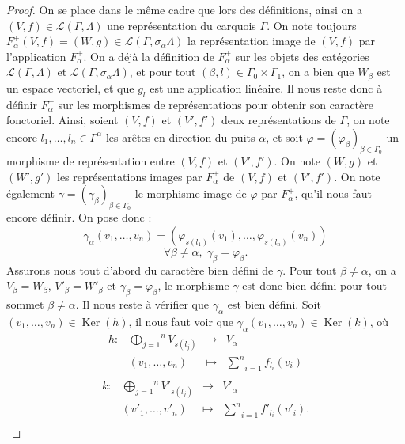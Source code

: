 \documentclass[a4paper,10pt]{article}
\DeclareMathOperator{\Ker}{Ker}
\begin{document}
\begin{proof}
	On se place dans le même cadre que lors des définitions, ainsi on a $(V,f)\in\mathscr{L}(\Gamma,\Lambda)$ une représentation du carquois $\Gamma$. On note toujours $F_{\alpha}^{+}(V,f)=(W,g)\in\mathscr{L}(\Gamma,\sigma_{\alpha}\Lambda)$ la représentation image de $(V,f)$ par l'application $F_{\alpha}^{+}$. On a déjà la définition de $F_{\alpha}^{+}$ sur les objets des catégories $\mathscr{L}(\Gamma,\Lambda)$ et $\mathscr{L}(\Gamma,\sigma_{\alpha}\Lambda)$, et pour tout $(\beta,l)\in\Gamma_{0}\times\Gamma_{1}$, on a bien que $W_{\beta}$ est un espace vectoriel, et que $g_{l}$ est une application linéaire. Il nous reste donc à définir $F_{\alpha}^{+}$ sur les morphismes de représentations pour obtenir son caractère fonctoriel. Ainsi, soient $(V,f)$ et $(V',f')$ deux représentations de $\Gamma$, on note encore $l_{1},\dots,l_{n}\in\Gamma^{\alpha}$ les arêtes en direction du puits $\alpha$, et soit $\varphi=(\varphi_{\beta})_{\beta\in\Gamma_{0}}$ un morphisme de représentation entre $(V,f)$ et $(V',f')$. On note $(W,g)$ et $(W',g')$ les représentations images par $F_{\alpha}^{+}$ de $(V,f)$ et $(V',f')$. On note également $\gamma=(\gamma_{\beta})_{\beta\in\Gamma_{0}}$ le morphisme image de $\varphi$ par $F_{\alpha}^{+}$, qu'il nous faut encore définir. On pose donc :
	\[	
		\gamma_{\alpha}(v_{1},\dots,v_{n})=(\varphi_{s(l_{1})}(v_{1}),\dots,\varphi_{s(l_{n})}(v_{n}))
	\]
	\[
		\forall \beta\neq\alpha,\; \gamma_{\beta}=\varphi_{\beta}.
	\]
	Assurons nous tout d'abord du caractère bien défini de $\gamma$. Pour tout $\beta\neq\alpha$, on a $V_{\beta}=W_{\beta}$, $V'_{\beta}=W'_{\beta}$ et $\gamma_{\beta}=\varphi_{\beta}$, le morphisme $\gamma$ est donc bien défini pour tout sommet $\beta\neq\alpha$. Il nous reste à vérifier que $\gamma_{\alpha}$ est bien défini. Soit $(v_{1},\dots,v_{n})\in\Ker(h)$, il nous faut voir que $\gamma_{\alpha}(v_{1},\dots,v_{n})\in\Ker(k)$, où
	\[
\begin{array}{lccc}
	h : & \overset{n}{\underset{j=1}{\bigoplus}}V_{s(l_{j})}&\rightarrow & V_{\alpha} \\ 
	& (v_{1},\dots,v_{n})&\mapsto & \underset{i=1}{\overset{n}{\sum}}f_{l_{i}}(v_{i})\\
\end{array}
	\]	
	\[
\begin{array}{lccc}
	k : & \overset{n}{\underset{j=1}{\bigoplus}}V'_{s(l_{j})}&\rightarrow & V'_{\alpha} \\ 
	& (v'_{1},\dots,v'_{n})&\mapsto & \underset{i=1}{\overset{n}{\sum}}f'_{l_{i}}(v'_{i}).\\

\end{array}\]
\end{proof}
\end{document}
